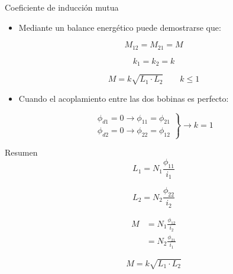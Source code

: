 \documentclass[aspectratio=169, usenames,svgnames,dvipsnames]{beamer}
\begin{document}
\begin{frame}[label={sec:orgd46c93a}]{Coeficiente de inducción mutua}
\begin{itemize}
\item Mediante un balance energético puede demostrarse que:
\end{itemize}
\[
  M_{12} = M_{21} = M
\]

\[
  k_1 = k_2 = k
\]

\[
  \boxed{M = k \sqrt{L_1 \cdot L_2}} \qquad  k \leq 1
\]

\begin{itemize}
\item Cuando el acoplamiento entre las dos bobinas es perfecto:
\end{itemize}

\[\left.
\begin{array}{cc}
  \phi_{d1} = 0 \rightarrow   \phi_{11} = \phi_{21}\\
  \phi_{d2} = 0 \rightarrow \phi_{22} = \phi_{12} 
  \end{array} \right\} \rightarrow k = 1
\]
\end{frame}

\begin{frame}[label={sec:orga642e09}]{Resumen}
\[
  L_1 = N_1 \frac{\phi_{11}}{i_1}
\]

\[
  L_2 = N_2 \frac{\phi_{22}}{i_2}
\]


\begin{align*}
  M &= N_1 \frac{\phi_{12}}{i_2}\\
    &= N_2 \frac{\phi_{21}}{i_1}
\end{align*}

\[
  M = k \sqrt{L_1 \cdot L_2}
\]
\end{frame}
\end{document}
